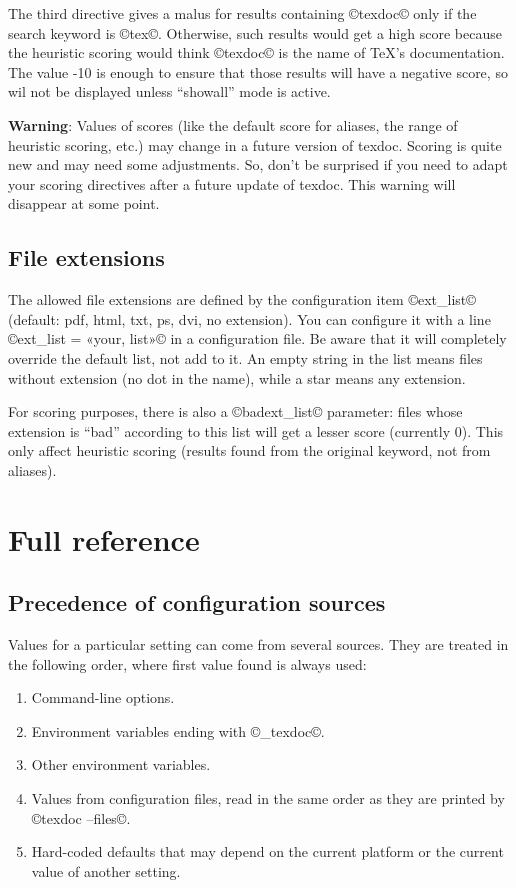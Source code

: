 \documentclass[a4paper, oneside]{scrartcl}
\begin{document}
The third directive gives a malus for results containing ©texdoc© only if the
search keyword is ©tex©. Otherwise, such results would get a high score
because the heuristic scoring would think ©texdoc© is the name of \TeX's
documentation. The value -10 is enough to ensure that those results will have
a negative score, so wil not be displayed unless ``showall'' mode is active.

\textbf{Warning}: Values of scores (like the default score for aliases, the
range of heuristic scoring, etc.) may change in a future version of texdoc.
Scoring is quite new and may need some adjustments. So, don't be surprised if
you need to adapt your scoring directives after a future update of texdoc.
This warning will disappear at some point.

\subsection{File extensions}

The allowed file extensions are defined by the configuration item ©ext_list©
(default: pdf, html, txt, ps, dvi, no extension). You can configure it with
a line ©ext_list = «your, list»© in a configuration file. Be aware
that it will completely override the default list, not add to it. An empty
string in the list means files without extension (no dot in the name), while a
star means any extension.

For scoring purposes, there is also a ©badext_list© parameter: files whose
extension is ``bad'' according to this list will get a lesser score (currently
0). This only affect heuristic scoring (results found from the original
keyword, not from aliases).

\clearpage

\section{Full reference}

\subsection{Precedence of configuration sources}\label{ss-prec}

Values for a particular setting can come from several sources. They are treated
in the following order, where first value found is always used:
\begin{enumerate}
  \item Command-line options.
  \item Environment variables ending with ©_texdoc©.
  \item Other environment variables.
  \item Values from configuration files, read in the same order as they are
    printed by ©texdoc --files©.
  \item Hard-coded defaults that may depend on the current platform or the
    current value of another setting.
\end{enumerate}
\end{document}
